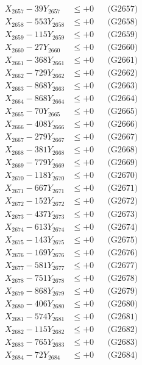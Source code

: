 \documentclass[a4paper,10pt]{article}
\begin{document}
{\begin{align}
X_{2657} - 39Y_{2657} &\leq +0 && \text{(G2657)} \\
X_{2658} - 553Y_{2658} &\leq +0 && \text{(G2658)} \\
X_{2659} - 115Y_{2659} &\leq +0 && \text{(G2659)} \\
X_{2660} - 27Y_{2660} &\leq +0 && \text{(G2660)} \\
\allowbreak
X_{2661} - 368Y_{2661} &\leq +0 && \text{(G2661)} \\
X_{2662} - 729Y_{2662} &\leq +0 && \text{(G2662)} \\
X_{2663} - 868Y_{2663} &\leq +0 && \text{(G2663)} \\
X_{2664} - 868Y_{2664} &\leq +0 && \text{(G2664)} \\
X_{2665} - 70Y_{2665} &\leq +0 && \text{(G2665)} \\
X_{2666} - 408Y_{2666} &\leq +0 && \text{(G2666)} \\
X_{2667} - 279Y_{2667} &\leq +0 && \text{(G2667)} \\
X_{2668} - 381Y_{2668} &\leq +0 && \text{(G2668)} \\
X_{2669} - 779Y_{2669} &\leq +0 && \text{(G2669)} \\
X_{2670} - 118Y_{2670} &\leq +0 && \text{(G2670)} \\
\allowbreak
X_{2671} - 667Y_{2671} &\leq +0 && \text{(G2671)} \\
X_{2672} - 152Y_{2672} &\leq +0 && \text{(G2672)} \\
X_{2673} - 437Y_{2673} &\leq +0 && \text{(G2673)} \\
X_{2674} - 613Y_{2674} &\leq +0 && \text{(G2674)} \\
X_{2675} - 143Y_{2675} &\leq +0 && \text{(G2675)} \\
X_{2676} - 169Y_{2676} &\leq +0 && \text{(G2676)} \\
X_{2677} - 581Y_{2677} &\leq +0 && \text{(G2677)} \\
X_{2678} - 751Y_{2678} &\leq +0 && \text{(G2678)} \\
X_{2679} - 868Y_{2679} &\leq +0 && \text{(G2679)} \\
X_{2680} - 406Y_{2680} &\leq +0 && \text{(G2680)} \\
\allowbreak
X_{2681} - 574Y_{2681} &\leq +0 && \text{(G2681)} \\
X_{2682} - 115Y_{2682} &\leq +0 && \text{(G2682)} \\
X_{2683} - 765Y_{2683} &\leq +0 && \text{(G2683)} \\
X_{2684} - 72Y_{2684} &\leq +0 && \text{(G2684)} \\

\end{align}}
\end{document}

